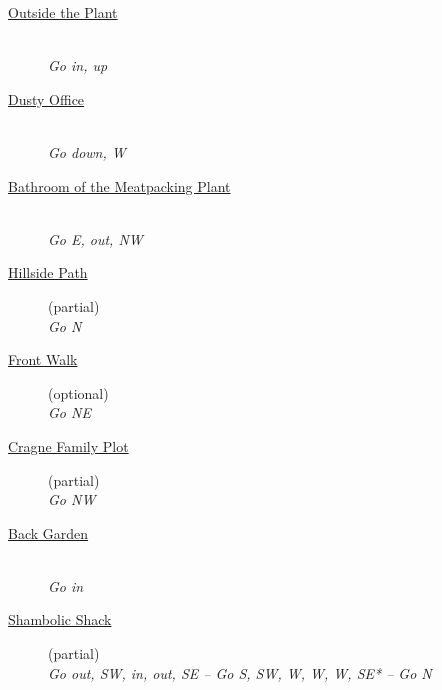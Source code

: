 \documentclass[a5paper]{extarticle}
\begin{document}
\newpage{}\label{sec:route-3}
\begin{description}
\item[{\hyperref[sec:req-Outside-the-Plant]{Outside the Plant}}] ~\\
  \emph{Go in, up}
\item[{\hyperref[sec:req-Dusty-Office]{Dusty Office}}] ~\\
  \emph{Go down, W}
\item[{\hyperref[sec:req-Bathroom-of-the-Meatpacking-Plant]{Bathroom of the Meatpacking Plant}}] ~\\
  \emph{Go E, out, NW}
\item[{\hyperref[sec:req-Hillside-Path]{Hillside Path}}] (partial)\\
  \emph{Go N}
\item[{\hyperref[sec:req-Front-Walk]{Front Walk}}] (optional)\\
  \emph{Go NE}
\item[{\hyperref[sec:req-Cragne-Family-Plot]{Cragne Family Plot}}] (partial)\\
  \emph{Go NW}
\item[{\hyperref[sec:req-Back-Garden]{Back Garden}}] ~\\
  \emph{Go in}
\item[{\hyperref[sec:req-Shambolic-Shack-0]{Shambolic Shack}}] (partial)\\
  \emph{Go out, SW, in, out, SE -- Go S, SW, W, W, W, SE* -- Go N}
\end{description}
\end{document}
